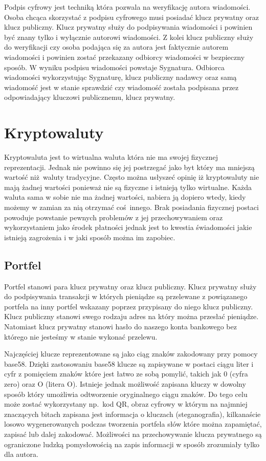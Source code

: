 \documentclass[conference]{IEEEtran}
\begin{document}
Podpis cyfrowy jest techniką która pozwala na weryfikację autora wiadomości. Osoba chcąca skorzystać z podpisu cyfrowego
musi posiadać klucz prywatny oraz klucz publiczny. Klucz prywatny służy do podpisywania wiadomości i powinien być znany
tylko i wyłącznie autorowi wiadomości. Z kolei klucz publiczny służy do weryfikacji czy osoba podająca się za autora
jest faktycznie autorem wiadomości i powinien zostać przekazany odbiorcy wiadomości w bezpieczny sposób. W wyniku
podpisu wiadomości powstaje Sygnatura. Odbiorca wiadomości wykorzystując Sygnaturę, klucz publiczny nadawcy oraz samą
wiadomość jest w stanie sprawdzić czy wiadomość została podpisana przez odpowiadający kluczowi publicznemu, klucz
prywatny.

\section{Kryptowaluty}

Kryptowaluta jest to wirtualna waluta która nie ma swojej fizycznej reprezentacji. Jednak nie powinno się jej postrzegać
jako byt który ma mniejszą wartość niż waluty tradycyjne. Często można usłyszeć opinię iż kryptowaluty nie mają żadnej
wartości ponieważ nie są fizyczne i istnieją tylko wirtualne. Każda waluta sama w sobie nie ma żadnej wartości, nabiera
ją dopiero wtedy, kiedy możemy w zamian za nią otrzymać coś innego. Brak posiadania fizycznej postaci powoduje powstanie
pewnych problemów z jej przechowywaniem oraz wykorzystaniem jako środek płatności jednak jest to kwestia świadomości
jakie istnieją zagrożenia i w jaki sposób można im zapobiec.

\subsection{Portfel}

Portfel stanowi para klucz prywatny oraz klucz publiczny. Klucz prywatny służy do podpisywania transakcji w których
pieniądze są przelewane z powiązanego portfela na inny portfel wskazany poprzez przypisany do niego klucz publiczny.
Klucz publiczny stanowi swego rodzaju adres na który można przesłać pieniądze. Natomiast klucz prywatny stanowi hasło do
naszego konta bankowego bez którego nie jesteśmy w stanie wykonać przelewu.

Najczęściej klucze reprezentowane są jako ciąg znaków zakodowany przy pomocy base58. Dzięki zastosowaniu base58 klucze
są zapisywane w postaci ciągu liter i cyfr z pomięciem znaków które jest łatwo ze sobą pomylić, takich jak 0 (cyfra
zero) oraz O (litera O). Istnieje jednak możliwość zapisana kluczy w dowolny sposób który umożliwia odtworzenie
oryginalnego ciągu znaków. Do tego celu może zostać wykorzystany np.\ kod QR, obraz cyfrowy w którym na najmniej
znaczących bitach zapisana jest informacja o kluczach (steganografia), kilkanaście losowo wygenerowanych podczas
tworzenia portfela słów które można zapamiętać, zapisać lub dalej zakodować. Możliwości na przechowywanie klucza
prywatnego są ograniczone ludzką pomysłowością na zapis informacji w sposób zrozumiały tylko dla autora.
\end{document}
